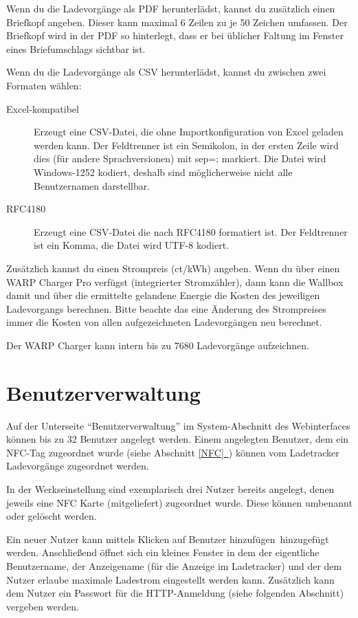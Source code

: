 \documentclass[a4paper,10pt]{article}
\newcommand*{\fullref}[1]{\hyperref[{#1}]{\ref*{#1}~\nameref*{#1}}}
\begin{document}
\begin{multicols*}{2}
	Wenn du die Ladevorgänge als PDF herunterlädst, kannst du zusätzlich einen Briefkopf angeben. Dieser kann maximal 6 Zeilen zu je 50 Zeichen
	umfassen. Der Briefkopf wird in der PDF so hinterlegt, dass er bei üblicher Faltung im Fenster eines Briefumschlags sichtbar ist.

	Wenn du die Ladevorgänge als CSV herunterlädst, kannst du zwischen zwei Formaten wählen:
	\begin{description}
	 \item[Excel-kompatibel] Erzeugt eine CSV-Datei, die ohne Importkonfiguration von Excel geladen werden kann. Der Feldtrenner ist ein Semikolon, in der ersten Zeile wird dies (für andere Sprachversionen) mit sep=; markiert. Die Datei wird Windows-1252 kodiert, deshalb sind möglicherweise nicht alle Benutzernamen darstellbar.
	 \item[RFC4180] Erzeugt eine CSV-Datei die nach RFC4180 formatiert ist. Der Feldtrenner ist ein Komma, die Datei wird UTF-8 kodiert.
	\end{description}


	Zusätzlich kannst du einen Strompreis (ct/kWh) angeben. Wenn du über einen
	WARP Charger Pro verfügst (integrierter Stromzähler), dann kann die Wallbox
	damit und über die ermittelte gelandene Energie die Kosten des jeweiligen
	Ladevorgangs berechnen. Bitte beachte das eine Änderung des Strompreises
	immer die Kosten von allen aufgezeichneten Ladevorgängen neu berechnet.

	Der WARP Charger kann intern bis zu 7680 Ladevorgänge aufzeichnen.

	\section{Benutzerverwaltung} \label{user_management}

	Auf der Unterseite \enquote{Benutzerverwaltung} im System-Abschnitt des Webinterfaces können bis zu 32 Benutzer angelegt werden.
	Einem angelegten Benutzer, dem ein NFC-Tag zugeordnet wurde (siehe Abschnitt \fullref{NFC}) können vom Ladetracker Ladevorgänge zugeordnet werden.

	In der Werkseinstellung sind exemplarisch drei Nutzer bereits angelegt,
	denen jeweils eine NFC Karte (mitgeliefert) zugeordnet wurde. Diese können
	umbenannt oder gelöscht werden.

	Ein neuer Nutzer kann mittels Klicken auf \glqq Benutzer hinzufügen\grqq~hinzugefügt werden.
	Anschließend öffnet sich ein kleines Fenster in dem der eigentliche Benutzername, der Anzeigename (für die Anzeige im Ladetracker)
	und der dem Nutzer erlaube maximale Ladestrom eingestellt werden kann.
	Zusätzlich kann dem Nutzer ein Passwort für die HTTP-Anmeldung (siehe
	folgenden Abschnitt) vergeben werden.


\end{multicols*}
\end{document}
